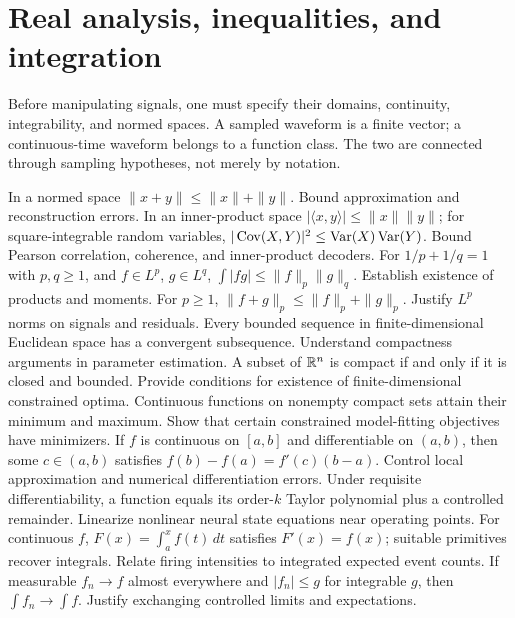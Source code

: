 \chapter{Real analysis, inequalities, and integration}
Before manipulating signals, one must specify their domains, continuity,
integrability, and normed spaces. A sampled waveform is a finite vector;
a continuous-time waveform belongs to a function class. The two are
connected through sampling hypotheses, not merely by notation.

{In a normed space $\|x+y\|\leq\|x\|+\|y\|$.}
{Bound approximation and reconstruction errors.}
{In an inner-product space $|\langle x,y\rangle|
\leq\|x\|\|y\|$; for square-integrable random variables,
$|\operatorname{Cov}(X,Y)|^2\leq\operatorname{Var}(X)\operatorname{Var}(Y)$.}
{Bound Pearson correlation, coherence, and inner-product decoders.}
{For $1/p+1/q=1$ with $p,q\geq1$, and $f\in L^p$,
$g\in L^q$, $\int|fg|\leq\|f\|_p\|g\|_q$.}
{Establish existence of products and moments.}
{For $p\geq1$, $\|f+g\|_p\leq\|f\|_p+\|g\|_p$.}
{Justify $L^p$ norms on signals and residuals.}
{Every bounded sequence in finite-dimensional Euclidean space
has a convergent subsequence.}
{Understand compactness arguments in parameter estimation.}
{A subset of $\mathbb{R}^n$ is compact if and only if it is closed and bounded.}
{Provide conditions for existence of finite-dimensional constrained optima.}
{Continuous functions on nonempty compact sets attain their
minimum and maximum.}
{Show that certain constrained model-fitting objectives have minimizers.}
{If $f$ is continuous on $[a,b]$ and differentiable on $(a,b)$,
then some $c\in(a,b)$ satisfies
$f(b)-f(a)=f'(c)(b-a)$.}
{Control local approximation and numerical differentiation errors.}
{Under requisite differentiability, a function equals its order-$k$
Taylor polynomial plus a controlled remainder.}
{Linearize nonlinear neural state equations near operating points.}
{For continuous $f$, $F(x)=\int_a^x f(t)\,dt$
satisfies $F'(x)=f(x)$; suitable primitives recover integrals.}
{Relate firing intensities to integrated expected event counts.}
{If measurable $f_n\to f$ almost everywhere and
$|f_n|\leq g$ for integrable $g$, then
$\int f_n\to\int f$.}
{Justify exchanging controlled limits and expectations.}
